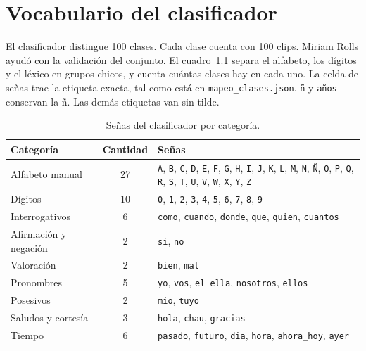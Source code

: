 \chapter{Vocabulario del clasificador}
\label{anexo:vocabulario}

El clasificador distingue 100 clases. Cada clase cuenta con 100 clips. Miriam Rolls ayudó con la validación del conjunto. El cuadro~\ref{tab:vocab_categorias} separa el alfabeto, los dígitos y el léxico en grupos chicos, y cuenta cuántas clases hay en cada uno. La celda de señas trae la etiqueta exacta, tal como está en \texttt{mapeo\_clases.json}. \texttt{ñ} y \texttt{años} conservan la ñ. Las demás etiquetas van sin tilde.

\begin{table}[H]
    \centering
    \small
    \caption{Señas del clasificador por categoría.}
    \label{tab:vocab_categorias}
    \begin{tabularx}{\textwidth}{>{\raggedright\arraybackslash}p{4.4cm} c X}
        \toprule
        \textbf{Categoría} & \textbf{Cantidad} & \textbf{Señas} \\
        \midrule
        Alfabeto manual & 27 & \texttt{A}, \texttt{B}, \texttt{C}, \texttt{D}, \texttt{E}, \texttt{F}, \texttt{G}, \texttt{H}, \texttt{I}, \texttt{J}, \texttt{K}, \texttt{L}, \texttt{M}, \texttt{N}, \texttt{Ñ}, \texttt{O}, \texttt{P}, \texttt{Q}, \texttt{R}, \texttt{S}, \texttt{T}, \texttt{U}, \texttt{V}, \texttt{W}, \texttt{X}, \texttt{Y}, \texttt{Z} \\
        Dígitos & 10 & \texttt{0}, \texttt{1}, \texttt{2}, \texttt{3}, \texttt{4}, \texttt{5}, \texttt{6}, \texttt{7}, \texttt{8}, \texttt{9} \\
        Interrogativos & 6 & \texttt{como}, \texttt{cuando}, \texttt{donde}, \texttt{que}, \texttt{quien}, \texttt{cuantos} \\
        Afirmación y negación & 2 & \texttt{si}, \texttt{no} \\
        Valoración & 2 & \texttt{bien}, \texttt{mal} \\
        Pronombres & 5 & \texttt{yo}, \texttt{vos}, \texttt{el\_ella}, \texttt{nosotros}, \texttt{ellos} \\
        Posesivos & 2 & \texttt{mio}, \texttt{tuyo} \\
        Saludos y cortesía & 3 & \texttt{hola}, \texttt{chau}, \texttt{gracias} \\
        Tiempo & 6 & \texttt{pasado}, \texttt{futuro}, \texttt{dia}, \texttt{hora}, \texttt{ahora\_hoy}, \texttt{ayer} \\

\end{tabularx}
\end{table}
